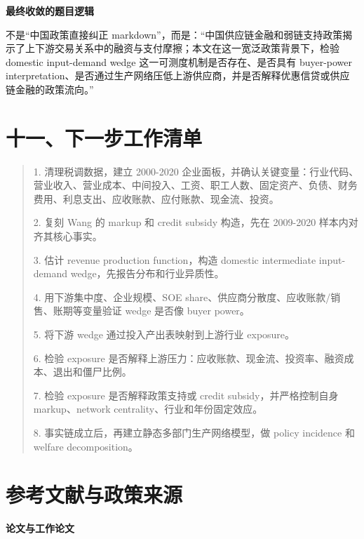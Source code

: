 \documentclass[
  12pt,
]{ctexart}
\begin{document}
\textbf{最终收敛的题目逻辑}

不是``中国政策直接纠正 markdown''，而是：``中国供应链金融和弱链支持政策揭示了上下游交易关系中的融资与支付摩擦；本文在这一宽泛政策背景下，检验 domestic input-demand wedge 这一可测度机制是否存在、是否具有 buyer-power interpretation、是否通过生产网络压低上游供应商，并是否解释优惠信贷或供应链金融的政策流向。''

\section{十一、下一步工作清单}\label{ux5341ux4e00ux4e0bux4e00ux6b65ux5de5ux4f5cux6e05ux5355}

\begin{quote}
1. 清理税调数据，建立 2000-2020 企业面板，并确认关键变量：行业代码、营业收入、营业成本、中间投入、工资、职工人数、固定资产、负债、财务费用、利息支出、应收账款、应付账款、现金流、投资。

2. 复刻 Wang 的 markup 和 credit subsidy 构造，先在 2009-2020 样本内对齐其核心事实。

3. 估计 revenue production function，构造 domestic intermediate input-demand wedge，先报告分布和行业异质性。

4. 用下游集中度、企业规模、SOE share、供应商分散度、应收账款/销售、账期等变量验证 wedge 是否像 buyer power。

5. 将下游 wedge 通过投入产出表映射到上游行业 exposure。

6. 检验 exposure 是否解释上游压力：应收账款、现金流、投资率、融资成本、退出和僵尸比例。

7. 检验 exposure 是否解释政策支持或 credit subsidy，并严格控制自身 markup、network centrality、行业和年份固定效应。

8. 事实链成立后，再建立静态多部门生产网络模型，做 policy incidence 和 welfare decomposition。
\end{quote}

\section{参考文献与政策来源}\label{ux53c2ux8003ux6587ux732eux4e0eux653fux7b56ux6765ux6e90}

\textbf{论文与工作论文}
\end{document}
